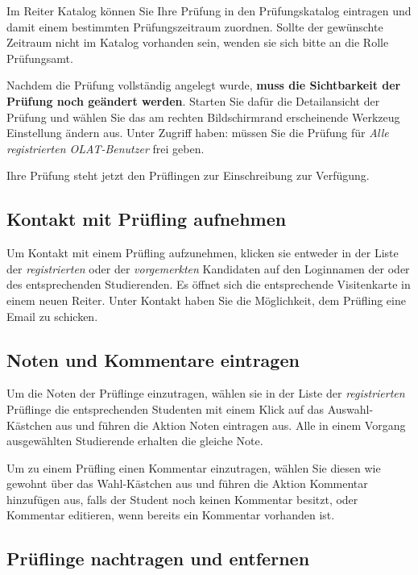 \documentclass[a4paper,11pt]{article}
\newcommand{\knopf}[1]{{\sc #1}}
\begin{document}
Im Reiter \knopf{Katalog} können Sie Ihre Prüfung in den Prüfungskatalog
eintragen und damit einem bestimmten Prüfungszeitraum zuordnen.  Sollte der
gewünschte Zeitraum nicht im Katalog vorhanden sein, wenden sie sich bitte an
die Rolle Prüfungsamt.

Nachdem die Prüfung vollständig angelegt wurde, {\bf muss die Sichtbarkeit der
  Prüfung noch geändert werden}. Starten Sie dafür die \knopf{Detailansicht}
der Prüfung und wählen Sie das am rechten Bildschirmrand erscheinende Werkzeug
\knopf{Einstellung ändern} aus. Unter \knopf{Zugriff haben:} müssen Sie die
Prüfung für {\em Alle registrierten OLAT-Benutzer} frei geben.  

Ihre Prüfung steht jetzt den Prüflingen zur Einschreibung zur Verfügung.

\subsection{Kontakt mit Prüfling aufnehmen}

Um Kontakt mit einem Prüfling aufzunehmen, klicken sie entweder in der Liste
der {\em registrierten} oder der {\em vorgemerkten} Kandidaten auf den
Loginnamen der oder des entsprechenden Studierenden. Es öffnet sich die
entsprechende \knopf{Visitenkarte} in einem neuen Reiter. Unter
\knopf{Kontakt} haben Sie die Möglichkeit, dem Prüfling eine Email zu
schicken.

\subsection{Noten und Kommentare eintragen}

Um die Noten der Prüflinge einzutragen, wählen sie in der Liste der {\em
  registrierten} Prüflinge die entsprechenden Studenten mit einem
Klick auf das Auswahl-Kästchen aus und führen die Aktion \knopf{Noten
  eintragen} aus. Alle in einem Vorgang ausgewählten Studierende erhalten die
gleiche Note.

Um zu einem Prüfling einen Kommentar einzutragen, wählen Sie diesen
wie gewohnt über das Wahl-Kästchen aus und führen die Aktion \knopf{Kommentar
  hinzufügen} aus, falls der Student noch keinen Kommentar besitzt, oder
\knopf{Kommentar editieren}, wenn bereits ein Kommentar vorhanden ist.

\subsection{Prüflinge nachtragen und entfernen}
\end{document}
